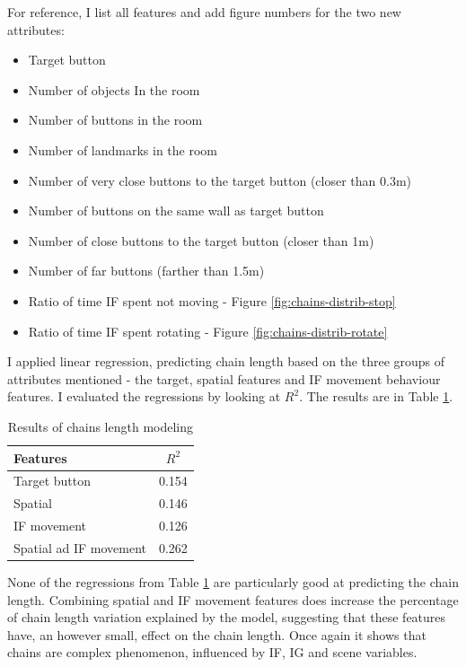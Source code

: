 For reference, I list all features and add figure numbers for the two new attributes:
\begin{itemize}
\item
Target button	
\item
Number of objects In the room
\item
Number of buttons in the room
\item
Number of landmarks in the room
\item
Number of very close buttons to the target button (closer than 0.3m)
\item
Number of buttons on the same wall as target button
\item
Number of close buttons to the target button (closer than 1m)
\item
Number of far buttons (farther than 1.5m)
\item
Ratio of time IF spent not moving - Figure \ref{fig:chains-distrib-stop}
\item
Ratio of time IF spent rotating - Figure \ref{fig:chains-distrib-rotate}
\end{itemize}

I applied linear regression, predicting chain length based on the three groups of attributes mentioned - the target, spatial features and IF movement behaviour features. I evaluated the regressions by looking at $R^2$. The results are in Table \ref{tab:chains-lr-length}.

\begin{table}[!htbp]
 \centering
\begin{tabular}{lc}
\toprule
Features & $R^2$  \\
\midrule
Target button & 0.154\\
Spatial & 0.146 \\
IF movement & 0.126 \\
Spatial ad IF movement & 0.262 \\
\bottomrule
\end{tabular}
\caption{Results of chains length modeling}
\label{tab:chains-lr-length}
\end{table}

None of the regressions from Table \ref{tab:chains-lr-length} are particularly good at predicting the chain length. Combining spatial and IF movement features does increase the percentage of chain length variation explained by the model, suggesting that these features have, an however small, effect on the chain length. Once again it shows that chains are complex phenomenon, influenced by IF, IG and scene variables.

